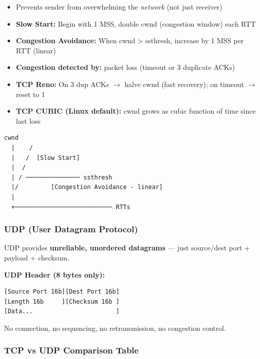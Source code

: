 \documentclass[11pt]{article}
\providecommand{\tightlist}{\setlength{\itemsep}{1pt}\setlength{\parskip}{0pt}}
\begin{document}
\begin{itemize}
\tightlist
\item
  Prevents sender from overwhelming the \emph{network} (not just receiver)
\item
  \textbf{Slow Start:} Begin with 1 MSS, double cwnd (congestion window) each RTT
\item
  \textbf{Congestion Avoidance:} When cwnd \textgreater{} ssthresh, increase by 1 MSS per RTT (linear)
\item
  \textbf{Congestion detected by:} packet loss (timeout or 3 duplicate ACKs)
\item
  \textbf{TCP Reno:} On 3 dup ACKs \(\rightarrow\) halve cwnd (fast recovery); on timeout \(\rightarrow\) reset to 1
\item
  \textbf{TCP CUBIC (Linux default):} cwnd grows as cubic function of time since last loss
\end{itemize}

\setcodelang{}

\begin{verbatim}
cwnd
  |    /
  |   /  [Slow Start]
  |  /
  | / ─────────────── ssthresh
  |/         [Congestion Avoidance - linear]
  |
  +─────────────────────────── RTTs
\end{verbatim}

\subsubsection{UDP (User Datagram Protocol)}\label{udp-user-datagram-protocol}

UDP provides \textbf{unreliable, unordered datagrams} --- just source/dest port + payload + checksum.

\textbf{UDP Header (8 bytes only):}

\setcodelang{}

\begin{verbatim}
[Source Port 16b][Dest Port 16b]
[Length 16b     ][Checksum 16b ]
[Data...                       ]
\end{verbatim}

No connection, no sequencing, no retransmission, no congestion control.

\subsubsection{TCP vs UDP Comparison Table}\label{tcp-vs-udp-comparison-table}
\end{document}
